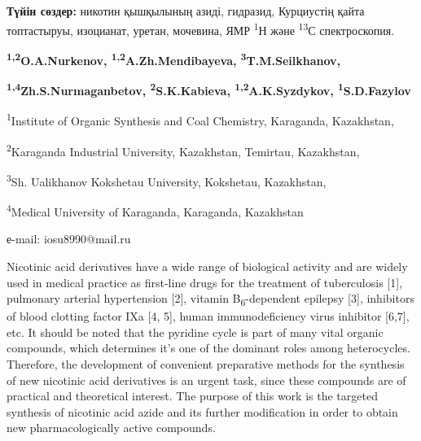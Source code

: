 {\bfseries Түйін сөздер:} никотин қышқылының азиді, гидразид, Курциустің
қайта топтастыруы, изоцианат, уретан, мочевина, ЯМР \textsuperscript{1}Н
және \textsuperscript{13}С спектроскопия.


\begin{center}
{\bfseries \textsuperscript{1,2}O.A.Nurkenov,
\textsuperscript{1,2}A.Zh.Mendibayeva,
\textsuperscript{3}T.M.Seilkhanov,}

{\bfseries \textsuperscript{1,4}Zh.S.Nurmaganbetov,
\textsuperscript{2}S.K.Kabieva, \textsuperscript{1,2}A.K.Syzdykov,
\textsuperscript{1}S.D.Fazylov\envelope}

\textsuperscript{1}Institute of Organic Synthesis and Coal Chemistry,
Karaganda, Kazakhstan,

\textsuperscript{2}Karaganda Industrial University, Kazakhstan,
Temirtau, Kazakhstan,

\textsuperscript{3}Sh. Ualikhanov Kokshetau University, Kokshetau,
Kazakhstan,

\textsuperscript{4}Medical University of Karaganda, Karaganda,
Kazakhstan

е-mail: iosu8990@mail.ru
\end{center}

Nicotinic acid derivatives have a wide range of biological activity and
are widely used in medical practice as first-line drugs for the
treatment of tuberculosis {[}1{]}, pulmonary arterial hypertension
{[}2{]}, vitamin B\textsubscript{6}-dependent epilepsy {[}3{]},
inhibitors of blood clotting factor IXa {[}4, 5{]}, human
immunodeficiency virus inhibitor {[}6,7{]}, etc. It should be noted that
the pyridine cycle is part of many vital organic compounds, which
determines it's one of the dominant roles among heterocycles. Therefore,
the development of convenient preparative methods for the synthesis of
new nicotinic acid derivatives is an urgent task, since these compounds
are of practical and theoretical interest. The purpose of this work is
the targeted synthesis of nicotinic acid azide and its further
modification in order to obtain new pharmacologically active compounds.

